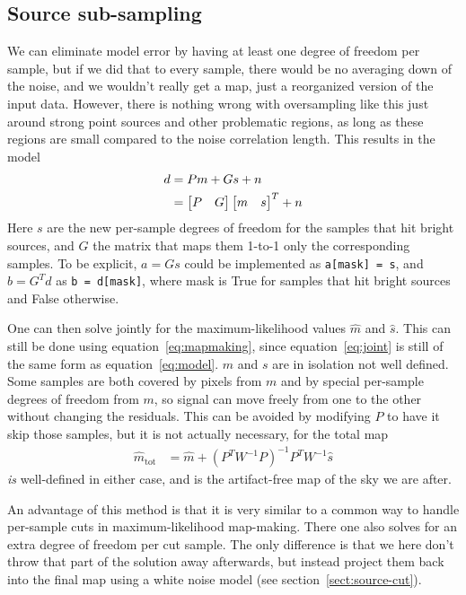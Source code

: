 \documentclass{article}
\newcommand{\code}[1]{\texttt{#1}}
\begin{document}
\subsection{Source sub-sampling}
We can eliminate model error by having at least one degree of freedom per sample,
but if we did that to every sample, there would be no averaging down of the noise,
and we wouldn't really get a map, just a reorganized version of the input data. However,
there is nothing wrong with oversampling like this just around strong point sources and
other problematic regions, as long as these regions are small compared to the noise
correlation length. This results in the model
\begin{align}
d &= Pm + Gs + n \notag \\
	&= \begin{bmatrix}P&G\end{bmatrix}\begin{bmatrix}m&s\end{bmatrix}^T + n \label{eq:joint}
\end{align}
Here $s$ are the new per-sample degrees of freedom for the samples that hit bright sources,
and $G$ the matrix that maps them 1-to-1 only the corresponding samples. To be explicit,
$a=Gs$ could be implemented as \code{a[mask] = s}, and $b=G^Td$ as \code{b = d[mask]},
where mask is True for samples that hit bright sources and False otherwise.

One can then solve jointly for the maximum-likelihood values $\hat m$ and $\hat s$. This can still
be done using equation~\ref{eq:mapmaking}, since equation~\ref{eq:joint} is still of the same form
as equation~\ref{eq:model}. $m$ and $s$ are in isolation not well defined. Some samples are
both covered by pixels from $m$ and by special per-sample degrees of freedom from $m$, so
signal can move freely from one to the other without changing the residuals. This can be avoided by
modifying $P$ to have it skip those samples, but it is not actually necessary, for
the total map
\begin{align}
\hat m_\textrm{tot}&= \hat m + (P^TW^{-1}P)^{-1}P^TW^{-1}\hat s \label{eq:jointsol}
\end{align}
\emph{is} well-defined in either case, and is the artifact-free map of the sky we are after.

An advantage of this method is that it is very similar to a common way to handle
per-sample cuts in maximum-likelihood map-making. There one also solves for an extra degree
of freedom per cut sample. The only difference is that we here don't throw that part of the
solution away afterwards, but instead project them back into the final map using a white noise model
(see section~\ref{sect:source-cut}).
\end{document}
